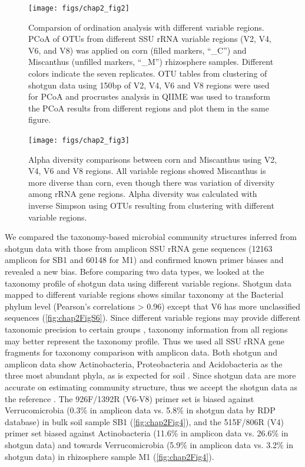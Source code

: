 \documentclass[]{msu-thesis}
\begin{document}
\begin{figure}[tbph!]
  \centering
  \texttt{[image: figs/chap2\_fig2]}
  \caption[Comparsion of ordination analysis with different variable regions]{Comparsion of ordination analysis with different variable regions. PCoA of OTUs from different SSU rRNA variable regions (V2, V4, V6, and V8) was applied on corn (filled markers, ``\_C'') and Miscanthus (unfilled markers, ``\_M'') rhizosphere samples. Different colors indicate the seven replicates. OTU tables from clustering of shotgun data using 150bp of V2, V4, V6 and V8 regions were used for PCoA and procrustes analysis in QIIME was used to transform the PCoA results from different regions and plot them in the same figure.}
  \label{fig:chap2Fig2}
\end{figure}


\begin{figure}[tbph!]
  \centering
  \texttt{[image: figs/chap2\_fig3]}
  \caption[Alpha diversity comparisons between corn and Miscanthus using V2, V4, V6 and V8 regions]{Alpha diversity comparisons between corn and Miscanthus using V2, V4, V6 and V8 regions. All variable regions showed Miscanthus is more diverse than corn, even though there was variation of diversity among rRNA gene regions. Alpha diversity was calculated with inverse Simpson using OTUs resulting from clustering with different variable regions.}
  \label{fig:chap2Fig3}
\end{figure}


We compared the taxonomy-based microbial community structures inferred from shotgun data with those from amplicon SSU rRNA gene sequences (12163 amplicon for SB1 and 60148 for M1) and confirmed known primer biases and revealed a new bias. Before comparing two data types, we looked at the taxonomy profile of shotgun data using different variable regions. Shotgun data mapped to different variable regions shows similar taxonomy at the Bacterial phylum level (Pearson’s correlations > 0.96) except that V6 has more unclassified sequences (\cref{fig:chap2FigS6}). Since different variable regions may provide different taxonomic precision to certain groups \cite{guo_taxonomic_2013}, taxonomy information from all regions may better represent the taxonomy profile. Thus we used all SSU rRNA gene fragments for taxonomy comparison with amplicon data. Both shotgun and amplicon data show Actinobacteria, Proteobacteria and Acidobacteria as the three most abundant phyla, as is expected for soil \cite{janssen_identifying_2006}. Since shotgun data are more accurate on estimating community structure, thus we accept the shotgun data as the reference \cite{haas_chimeric_2011,shakya_comparative_2013}. The 926F/1392R (V6-V8) primer set is biased against Verrucomicrobia (0.3\% in amplicon data vs. 5.8\% in shotgun data by RDP database) in bulk soil sample SB1 (\cref{fig:chap2Fig4}), and the 515F/806R (V4) primer set biased against Actinobacteria (11.6\% in amplicon data vs. 26.6\% in shotgun data) and towards Verrucomicrobia (5.9\% in amplicon data vs. 3.2\% in shotgun data) in rhizosphere sample M1 (\cref{fig:chap2Fig4}).
\end{document}
